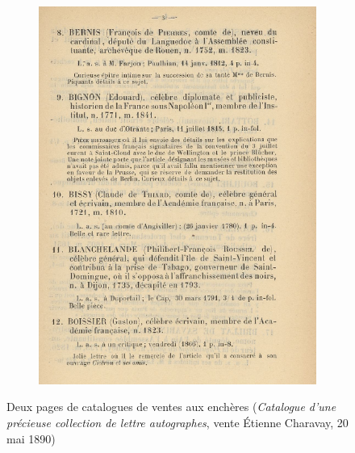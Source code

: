 \begin{figure}[h]
\begin{subfigure}{0.45\textwidth}
		\includegraphics[width=\textwidth]{img/CAT_000441_1.png}
	\end{subfigure}
	\caption{Deux pages de catalogues de ventes aux enchères (\textit{Catalogue d'une précieuse collection de lettre autographes}, vente Étienne Charavay, 20 mai 1890)}
	\label{fig:catpage}
\end{figure}

